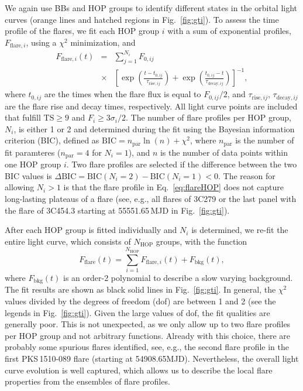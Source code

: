 \documentclass[twocolumn,linenumbers]{aastex62}
\begin{document}
We again use BBs and HOP groups to identify different states in 
the orbital light curves (orange lines and hatched regions in Fig.~\ref{fig:gti}). 
To assess the time profile of the flares,
we fit each HOP group $i$ with a sum of exponential profiles, $F_{\mathrm{flare},i}$,
using a $\chi^2$ minimization, and
\begin{eqnarray}
    F_{\mathrm{flare},i}(t) &=& 
    \sum\limits_{j = 1}^{N_i} F_{0,ij}\nonumber\\
    &\times&\left[\exp\left(\frac{t - t_{0,ij}}{\tau_{\mathrm{rise},ij}}\right) + \exp
    \left(\frac{t_{0,ij} - t}{\tau_{\mathrm{decay},ij}}\right)\right]^{-1}\!\!\!,
    \label{eq:flareHOP}
\end{eqnarray}
where $t_{0,ij}$ are the times when the flare flux is equal to $F_{0,ij} / 2$, and $\tau_{\mathrm{rise},ij}$, $\tau_{\mathrm{decay},ij}$ are the flare rise and decay times, respectively.
All light curve points are included that fulfill $\mathrm{TS}\geqslant9$ and $F_i \geqslant 3\sigma_i/2 $.
The number of flare profiles per HOP group, $N_i$, is either 1 or 2 and determined during the fit using the Bayesian information criterion (BIC), defined as $\mathrm{BIC} = n_\mathrm{par}\ln(n) + \chi^2$, where $n_\mathrm{par}$ is the number of fit paramteres ($n_\mathrm{par} = 4$ for $N_i = 1$), and $n$ is the number of data points within one HOP group $i$. 
Two flare profiles are selected if the difference between the two BIC values is $\Delta\mathrm{BIC} = \mathrm{BIC}(N_i = 2) - \mathrm{BIC}(N_i = 1) < 0$.
The reason for allowing $N_i > 1$ is that the flare profile in Eq.~\ref{eq:flareHOP} does not capture long-lasting plateaus of a flare (see, e.g., all flares of 3C279 or the last panel with the flare of 3C454.3 starting at 55551.65\,MJD in Fig.~\ref{fig:gti}).

After each HOP group is fitted individually and $N_i$ is determined, 
we re-fit the entire light curve, which consists of $N_\mathrm{HOP}$ groups, with the function 
\begin{equation}
    F_\mathrm{flare}(t) = \sum\limits_{i = 1}^{N_\mathrm{HOP}}F_{\mathrm{flare},i}(t) + F_\mathrm{bkg}(t),
\end{equation}
where $F_\mathrm{bkg}(t)$ is an order-2 polynomial to describe a slow  varying background.
The fit results are shown as black solid lines in Fig.~\ref{fig:gti}.
In general, the $\chi^2$ values divided by the degrees of freedom (dof) are between 1 and 2 (see the legends in Fig.~\ref{fig:gti}). Given the large values of dof, the fit qualities are generally poor. This is not unexpected, as we only allow up to two flare profiles per HOP group and not arbitrary functions. Already with this choice, there are probably some spurious flares identified, see, e.g., the second flare profile in the first PKS\,1510-089 flare (starting at 54908.65MJD). 
Nevertheless, the overall light curve evolution is well captured, which allows us to describe the local flare properties from the ensembles of flare profiles. %
\end{document}
